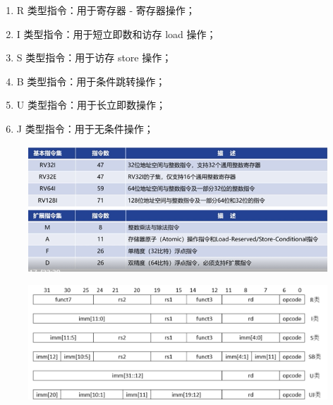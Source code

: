 \documentclass[a4paper, 14pt, oneside]{book} %
\numberwithin{equation}{subsection}
\begin{document}
\begin{enumerate}
\begin{enumerate}
\begin{enumerate}
				\item 	R 类型指令：用于寄存器 - 寄存器操作；
				\item   I 类型指令：用于短立即数和访存 load 操作；
				\item S 类型指令：用于访存 store 操作；
				\item B 类型指令：用于条件跳转操作；
				\item U 类型指令：用于长立即数操作；
				\item J 类型指令：用于无条件操作；
			\end{enumerate}
			\begin{figure}[!htbp]
				\centering
				\includegraphics[scale=0.8]{img/two.png}
			\end{figure}
			\begin{figure}[!htbp]
				\centering
				\includegraphics[scale=0.5]{img/three.png}
			\end{figure}
		\end{enumerate}
		

\end{enumerate}
\end{document}
